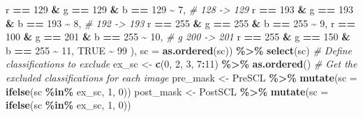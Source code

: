 \documentclass[
]{article}
\newenvironment{Shaded}{\begin{snugshade}}{\end{snugshade}}
\newcommand{\AttributeTok}[1]{\textcolor[rgb]{0.13,0.29,0.53}{#1}}
\newcommand{\CommentTok}[1]{\textcolor[rgb]{0.56,0.35,0.01}{\textit{#1}}}
\newcommand{\ConstantTok}[1]{\textcolor[rgb]{0.56,0.35,0.01}{#1}}
\newcommand{\DecValTok}[1]{\textcolor[rgb]{0.00,0.00,0.81}{#1}}
\newcommand{\FunctionTok}[1]{\textcolor[rgb]{0.13,0.29,0.53}{\textbf{#1}}}
\newcommand{\NormalTok}[1]{#1}
\newcommand{\OtherTok}[1]{\textcolor[rgb]{0.56,0.35,0.01}{#1}}
\newcommand{\SpecialCharTok}[1]{\textcolor[rgb]{0.81,0.36,0.00}{\textbf{#1}}}
\begin{document}
\begin{Shaded}
\begin{Highlighting}[]
\NormalTok{            r }\SpecialCharTok{==} \DecValTok{129} \SpecialCharTok{\&}\NormalTok{ g }\SpecialCharTok{==} \DecValTok{129} \SpecialCharTok{\&}\NormalTok{ b }\SpecialCharTok{==} \DecValTok{129} \SpecialCharTok{\textasciitilde{}} \DecValTok{7}\NormalTok{,   }\CommentTok{\#  128 {-}\textgreater{} 129}
\NormalTok{            r }\SpecialCharTok{==} \DecValTok{193} \SpecialCharTok{\&}\NormalTok{ g }\SpecialCharTok{==} \DecValTok{193} \SpecialCharTok{\&}\NormalTok{ b }\SpecialCharTok{==} \DecValTok{193} \SpecialCharTok{\textasciitilde{}} \DecValTok{8}\NormalTok{,   }\CommentTok{\#  192 {-}\textgreater{} 193}
\NormalTok{            r }\SpecialCharTok{==} \DecValTok{255} \SpecialCharTok{\&}\NormalTok{ g }\SpecialCharTok{==} \DecValTok{255} \SpecialCharTok{\&}\NormalTok{ b }\SpecialCharTok{==} \DecValTok{255} \SpecialCharTok{\textasciitilde{}} \DecValTok{9}\NormalTok{, }
\NormalTok{            r }\SpecialCharTok{==} \DecValTok{100} \SpecialCharTok{\&}\NormalTok{ g }\SpecialCharTok{==} \DecValTok{201} \SpecialCharTok{\&}\NormalTok{ b }\SpecialCharTok{==} \DecValTok{255} \SpecialCharTok{\textasciitilde{}} \DecValTok{10}\NormalTok{,  }\CommentTok{\# g 200 {-}\textgreater{} 201}
\NormalTok{            r }\SpecialCharTok{==} \DecValTok{255} \SpecialCharTok{\&}\NormalTok{ g }\SpecialCharTok{==} \DecValTok{150} \SpecialCharTok{\&}\NormalTok{ b }\SpecialCharTok{==} \DecValTok{255} \SpecialCharTok{\textasciitilde{}} \DecValTok{11}\NormalTok{, }
            \ConstantTok{TRUE} \SpecialCharTok{\textasciitilde{}} \DecValTok{99}\NormalTok{ ), }
            \AttributeTok{sc =} \FunctionTok{as.ordered}\NormalTok{(sc)) }\SpecialCharTok{\%\textgreater{}\%}
          \FunctionTok{select}\NormalTok{(sc)}
        \CommentTok{\# Define classifications to exclude}
\NormalTok{          ex\_sc }\OtherTok{\textless{}{-}} \FunctionTok{c}\NormalTok{(}\DecValTok{0}\NormalTok{, }\DecValTok{2}\NormalTok{, }\DecValTok{3}\NormalTok{, }\DecValTok{7}\SpecialCharTok{:}\DecValTok{11}\NormalTok{) }\SpecialCharTok{\%\textgreater{}\%} \FunctionTok{as.ordered}\NormalTok{() }
        \CommentTok{\# Get the excluded classifications for each image}
\NormalTok{          pre\_mask }\OtherTok{\textless{}{-}} 
\NormalTok{            PreSCL }\SpecialCharTok{\%\textgreater{}\%}
            \FunctionTok{mutate}\NormalTok{(}\AttributeTok{sc =} \FunctionTok{ifelse}\NormalTok{(sc }\SpecialCharTok{\%in\%}\NormalTok{ ex\_sc, }\DecValTok{1}\NormalTok{, }\DecValTok{0}\NormalTok{)) }
\NormalTok{          post\_mask }\OtherTok{\textless{}{-}} 
\NormalTok{            PostSCL }\SpecialCharTok{\%\textgreater{}\%}
            \FunctionTok{mutate}\NormalTok{(}\AttributeTok{sc =} \FunctionTok{ifelse}\NormalTok{(sc }\SpecialCharTok{\%in\%}\NormalTok{ ex\_sc, }\DecValTok{1}\NormalTok{, }\DecValTok{0}\NormalTok{))}

\end{Highlighting}
\end{Shaded}
\end{document}
